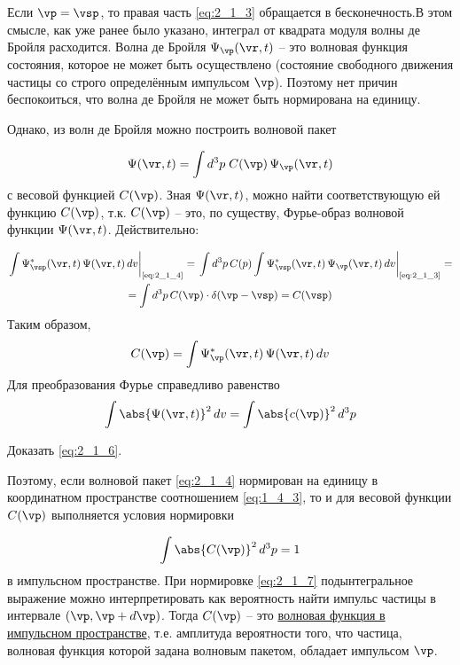 Если $\vp=\vsp$, то правая часть \eqref{eq:2_1_3} обращается в бесконечность.В этом смысле, как уже ранее было указано, интеграл от квадрата модуля волны де Бройля расходится. Волна де Бройля $\Psi_{\vp}(\vr, t)$ -- это волновая функция состояния, которое не может быть осуществлено (состояние свободного движения частицы со строго определённым импульсом $\vp$). Поэтому нет причин беспокоиться, что волна де Бройля не может быть нормирована на единицу.

Однако, из волн де Бройля можно построить волновой пакет

\begin{equation}
\label{eq:2_1_4}
\Psi(\vr,t) = \int d^3p \; C(\vp) \, \Psi_{\vp}(\vr,t)
\end{equation}%
%
с весовой функцией $C(\vp)$. Зная $\Psi(\vr,t)$, можно найти соответствующую ей функцию $C(\vp)$, т.к. $C(\vp)$ -- это, по существу, Фурье-образ волновой функции $\Psi(\vr,t)$. Действительно:
%

$$
\begin{gathered}
\left. \int \Psi^*_{\vsp}(\vr,t) \, \Psi(\vr,t) \, dv \right|_{\text{\eqref{eq:2_1_4}}} =
  \left. \int d^3p \, C(p) \int \Psi^*_{\vsp}(\vr,t) \, \Psi_{\vp}(\vr,t) \, dv \right|_{\text{\eqref{eq:2_1_3}}} =\\
  = \int d^3p \, C(\vp) \cdot \delta (\vp - \vsp) = C(\vsp)
\end{gathered}
$$%
%
Таким образом,
\begin{equation}
\label{eq:2_1_5}
C(\vp) = \int\Psi^*_{\vp}(\vr,t) \, \Psi(\vr,t) \, dv
\end{equation}%
%
Для преобразования Фурье справедливо равенство
\begin{equation}
\label{eq:2_1_6}
\int \abs{ \Psi(\vr,t) }^2 \, dv = \int \abs{c(\vp)}^2 \, d^3 p
\end{equation}

\begin{excr}
Доказать \eqref{eq:2_1_6}.
\end{excr}%

\noindent
Поэтому, если волновой пакет \eqref{eq:2_1_4} нормирован на единицу в координатном пространстве соотношением \eqref{eq:1_4_3}, то и для весовой функции $C(\vp)$ выполняется условия нормировки

\begin{equation}
\label{eq:2_1_7}
\int \abs{C(\vp)}^2 \, d^3 p = 1
\end{equation}%
%
в импульсном пространстве. При нормировке \eqref{eq:2_1_7} подынтегральное выражение можно интерпретировать как вероятность найти импульс частицы в интервале $(\vp,\vp+d\vp)$. Тогда $C(\vp)$ -- это \underline{волновая функция в импульсном пространстве}, т.е. амплитуда вероятности того, что частица, волновая функция которой задана волновым пакетом, обладает импульсом $\vp$.

